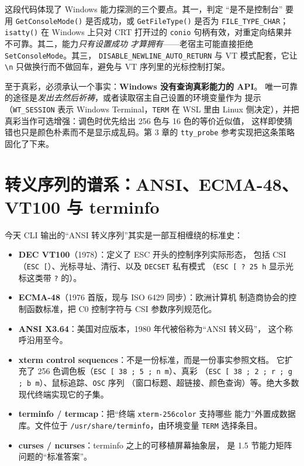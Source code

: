 \documentclass[12pt,a4paper,fontset=fandol]{ctexbook}
\newcommand{\Fn}[1]{\texttt{#1()}}
\newcommand{\Tp}[1]{\texttt{#1}}
\begin{document}
这段代码体现了 Windows 能力探测的三个要点。其一，判定 ``是不是控制台'' 要用
\Fn{GetConsoleMode} 是否成功，或 \Fn{GetFileType} 是否为
\Tp{FILE\_TYPE\_CHAR}；\Fn{isatty} 在 Windows 上只对 CRT 打开过的
\Tp{conio} 句柄有效，对重定向结果并不可靠。其二，能力\emph{只有设置成功
才算拥有}——老宿主可能直接拒绝 \Tp{SetConsoleMode}。其三，
\Tp{DISABLE\_NEWLINE\_AUTO\_RETURN} 与 VT 模式配套，它让 \Tp{\textbackslash n}
只做换行而不做回车，避免与 VT 序列里的光标控制打架。

至于真彩，必须承认一个事实：\textbf{Windows 没有查询真彩能力的 API}。
唯一可靠的途径是\emph{发出去然后祈祷}，或者读取宿主自己设置的环境变量作为
提示（\Tp{WT\_SESSION} 表示 Windows Terminal，\Tp{TERM} 在 WSL 里由 Linux
侧决定），并把真彩当作可选增强：调色时优先给出 256 色与 16 色的等价近似值，
这样即使猜错也只是颜色朴素而不是显示成乱码。第 3 章的 \Tp{tty\_probe}
参考实现把这条策略固化了下来。

\section{转义序列的谱系：ANSI、ECMA-48、VT100 与 terminfo}

今天 CLI 输出的``ANSI 转义序列''其实是一部互相缠绕的标准史：

\begin{itemize}
\item \textbf{DEC VT100}（1978）：定义了 ESC 开头的控制序列实际形态，
      包括 CSI（\Tp{ESC [}）、光标寻址、清行、以及 \Tp{DECSET} 私有模式
      （\Tp{ESC [ ? 25 h} 显示光标这类带 \Tp{?} 的）。
\item \textbf{ECMA-48}（1976 首版，现与 ISO 6429 同步）：欧洲计算机
      制造商协会的控制函数标准，把 C0 控制字符与 CSI 参数序列规范化。
\item \textbf{ANSI X3.64}：美国对应版本，1980 年代被俗称为``ANSI 转义码''，
      这个称呼沿用至今。
\item \textbf{xterm control sequences}：不是一份标准，而是一份事实参照文档。
      它扩充了 256 色调色板（\Tp{ESC [ 38 ; 5 ; n m}）、真彩
      （\Tp{ESC [ 38 ; 2 ; r ; g ; b m}）、鼠标追踪、\Tp{OSC} 序列
      （窗口标题、超链接、颜色查询）等。绝大多数现代终端实现它的子集。
\item \textbf{terminfo / termcap}：把``终端 \Tp{xterm-256color} 支持哪些
      能力''外置成数据库。文件位于 \Tp{/usr/share/terminfo}，由环境变量
      \Tp{TERM} 选择条目。
\item \textbf{curses / ncurses}：terminfo 之上的可移植屏幕抽象层，
      是 1.5 节能力矩阵问题的``标准答案''。
\end{itemize}
\end{document}
